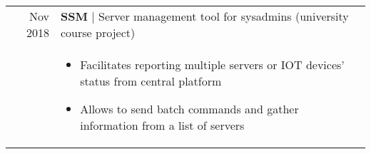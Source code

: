 \documentclass[a4paper,10pt]{article}
\begin{document}
\begin{tabular}{rp{14.85cm}}
 Nov 2018 & \textbf{SSM} | Server management tool for sysadmins (university course project)\\
 & \footnotesize{ \begin{itemize}[noitemsep,topsep=3pt]
 \vspace{-0.1in}
 \item Facilitates reporting multiple servers or IOT devices' status from central platform 
 \item Allows to send batch commands and gather information from a list of servers
 \end{itemize}} \\


\end{tabular}
\end{document}
